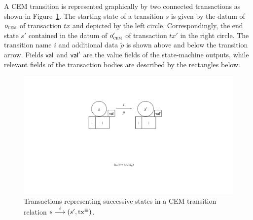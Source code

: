 A CEM transition is represented graphically by two connected transactions as
shown in Figure~\ref{fig:state-transition}. The starting state of a transition
$s$ is given by the datum of $o_{\textsc{cem}}$ of transaction $tx$ and depicted by the
left circle. Correspondingly, the end state $s'$ contained in the datum of
$o_{\textsc{cem}}'$ of transaction $tx'$ in the right circle. The transition name $i$ and
additional data $\tilde \rho$ is shown above and below the transition arrow.
Fields $\mathsf{val}$ and $\mathsf{val}'$ are the value fields of the state-machine outputs,
while relevant fields of the transaction bodies are described by the rectangles
below.

\begin{figure}[h]
  \centering
  \includegraphics[scale=.2,width=\textwidth/2]{figures/state-transition_cropped.pdf}
  \caption{Transactions representing successive states in a CEM
    transition relation \({s}\overset{i}\longrightarrow(s', \mathrm{tx}^\equiv)\).}\label{fig:state-transition}
\end{figure}

